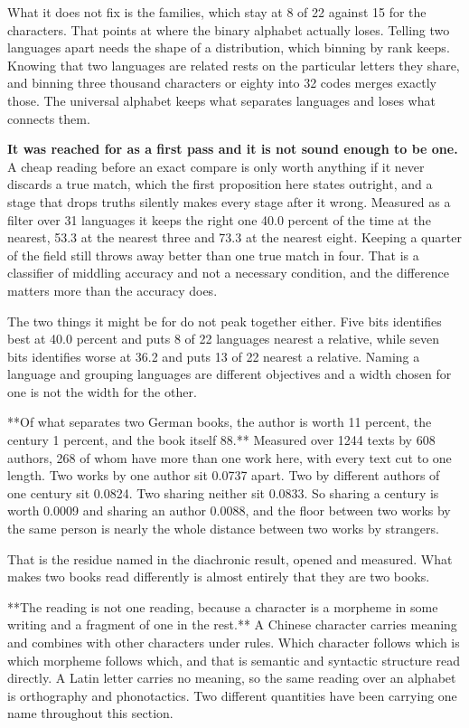What it does not fix is the families, which stay at 8 of 22 against 15 for the characters. That points at where the binary alphabet actually loses. Telling two languages apart needs the shape of a distribution, which binning by rank keeps. Knowing that two languages are related rests on the particular letters they share, and binning three thousand characters or eighty into 32 codes merges exactly those. The universal alphabet keeps what separates languages and loses what connects them.

\textbf{It was reached for as a first pass and it is not sound enough to be one.} A cheap reading before an exact compare is only worth anything if it never discards a true match, which the first proposition here states outright, and a stage that drops truths silently makes every stage after it wrong. Measured as a filter over 31 languages it keeps the right one 40.0 percent of the time at the nearest, 53.3 at the nearest three and 73.3 at the nearest eight. Keeping a quarter of the field still throws away better than one true match in four. That is a classifier of middling accuracy and not a necessary condition, and the difference matters more than the accuracy does.

The two things it might be for do not peak together either. Five bits identifies best at 40.0 percent and puts 8 of 22 languages nearest a relative, while seven bits identifies worse at 36.2 and puts 13 of 22 nearest a relative. Naming a language and grouping languages are different objectives and a width chosen for one is not the width for the other.

**Of what separates two German books, the author is worth 11 percent, the century 1 percent, and the book itself 88.** Measured over 1244 texts by 608 authors, 268 of whom have more than one work here, with every text cut to one length. Two works by one author sit 0.0737 apart. Two by different authors of one century sit 0.0824. Two sharing neither sit 0.0833. So sharing a century is worth 0.0009 and sharing an author 0.0088, and the floor between two works by the same person is nearly the whole distance between two works by strangers.

That is the residue named in the diachronic result, opened and measured. What makes two books read differently is almost entirely that they are two books.

**The reading is not one reading, because a character is a morpheme in some writing and a fragment of one in the rest.** A Chinese character carries meaning and combines with other characters under rules. Which character follows which is which morpheme follows which, and that is semantic and syntactic structure read directly. A Latin letter carries no meaning, so the same reading over an alphabet is orthography and phonotactics. Two different quantities have been carrying one name throughout this section.

